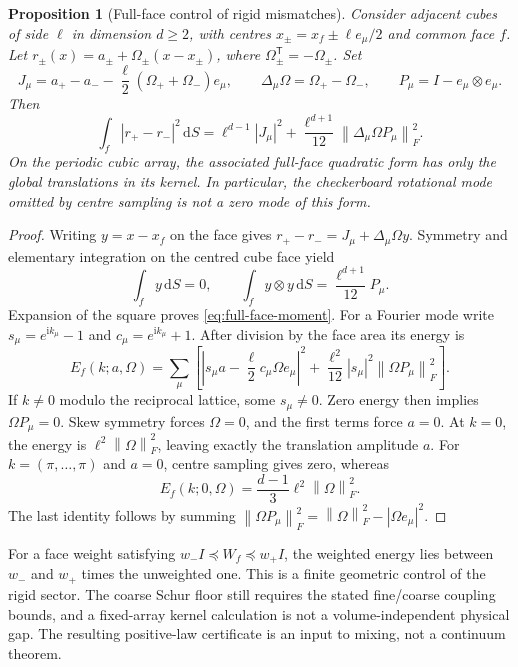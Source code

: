 \documentclass[11pt,a4paper,oneside]{book}
\theoremstyle{plain}
\newtheorem{proposition}[theorem]{Proposition}
\theoremstyle{definition}
\theoremstyle{remark}
\newcommand{\dd}{\mathrm d}
\newcommand{\ii}{\mathrm i}
\newcommand{\norm}[1]{\left\lVert#1\right\rVert}
\newcommand{\src}[2]{\cite{#1}}
\begin{document}
\begin{proposition}[Full-face control of rigid mismatches]
\label{prop:full-face-rigid}
Consider adjacent cubes of side $\ell$ in dimension $d\ge2$, with centres
$x_\pm=x_f\pm\ell e_\mu/2$ and common face $f$.  Let
$r_\pm(x)=a_\pm+\Omega_\pm(x-x_\pm)$, where
$\Omega_\pm^{\mathsf T}=-\Omega_\pm$.  Set
\begin{equation}
 J_\mu=a_+-a_--\frac\ell2(\Omega_++\Omega_-)e_\mu,
 \qquad \Delta_\mu\Omega=\Omega_+-\Omega_-,\qquad
 P_\mu=I-e_\mu\otimes e_\mu.
 \label{eq:face-rigid-definitions}
\end{equation}
Then
\begin{equation}
 \int_f|r_+-r_-|^2\,\dd S
 =\ell^{d-1}|J_\mu|^2+\frac{\ell^{d+1}}{12}
                  \norm{\Delta_\mu\Omega P_\mu}_F^2.
 \label{eq:full-face-moment}
\end{equation}
On the periodic cubic array, the associated full-face quadratic form has
only the global translations in its kernel.  In particular, the
checkerboard rotational mode omitted by centre sampling is not a zero
mode of this form.
\end{proposition}
\begin{proof}
Writing $y=x-x_f$ on the face gives
$r_+-r_-=J_\mu+\Delta_\mu\Omega y$.  Symmetry and elementary integration
on the centred cube face yield
\[
 \int_fy\,\dd S=0,
 \qquad \int_fy\otimes y\,\dd S=\frac{\ell^{d+1}}{12}P_\mu.
\]
Expansion of the square proves \eqref{eq:full-face-moment}.  For a Fourier
mode write $s_\mu=e^{\ii k_\mu}-1$ and $c_\mu=e^{\ii k_\mu}+1$.  After
division by the face area its energy is
\begin{equation}
 E_f(k;a,\Omega)=\sum_\mu\left[
 \left|s_\mu a-\frac\ell2c_\mu\Omega e_\mu\right|^2
 +\frac{\ell^2}{12}|s_\mu|^2\norm{\Omega P_\mu}_F^2\right].
 \label{eq:full-face-symbol}
\end{equation}
If $k\ne0$ modulo the reciprocal lattice, some $s_\mu\ne0$.
Zero energy then implies $\Omega P_\mu=0$.  Skew symmetry forces
$\Omega=0$, and the first terms force $a=0$.  At $k=0$, the energy is
$\ell^2\norm\Omega_F^2$, leaving exactly the translation amplitude $a$.
For $k=(\pi,\ldots,\pi)$ and $a=0$, centre sampling gives zero, whereas
\[
 E_f(k;0,\Omega)=\frac{d-1}{3}\ell^2\norm\Omega_F^2.
\]
The last identity follows by summing
$\norm{\Omega P_\mu}_F^2=\norm\Omega_F^2-|\Omega e_\mu|^2$.
\end{proof}
\src{R16}{lem:v16v79-moment,thm:v16v79-face-energy,thm:v16v79-no-hourglass}

For a face weight satisfying $w_-I\preceq W_f\preceq w_+I$, the weighted
energy lies between $w_-$ and $w_+$ times the unweighted one.  This is a
finite geometric control of the rigid sector.  The coarse Schur floor
still requires the stated fine/coarse coupling bounds, and a fixed-array
kernel calculation is not a volume-independent physical gap.  The
resulting positive-law certificate is an input to mixing, not a continuum
theorem.  \src{R16}{prop:v16v79-weighted,thm:v16v82-flat-schur,thm:v16v83-positive-gap}
\end{document}
